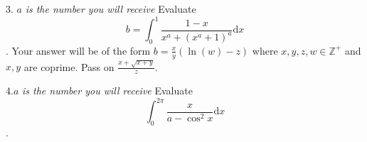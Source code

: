 \documentclass[11pt, a4paper]{article}
\newcommand{\dd}{\mathrm{d}}
\begin{document}
\begin{enumerate}
3. $a$\textit{ is the number you will receive} \newline Evaluate $$b=\int_0^1 \frac{1-x}{x^a+(x^a+1)^a} \dd x$$. Your answer will be of the form $b=\frac{x}{y}(\ln(w)-z)$ where $x,y,z,w \in \mathbb{Z^+}$ and $x,y$ are coprime. Pass on $\frac{x+\sqrt{x+y}}{z}$. \newline  \newline \newline \newline \newline \newline 

4.$a$\textit{ is the number you will receive} \newline Evaluate $$\int_0^{2\pi} \frac{x}{a - \cos^2{x}} \dd x$$. 

    \end{enumerate}
\end{document}
